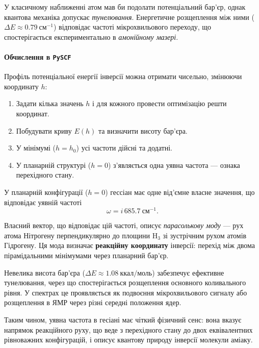 {У класичному наближенні атом  мав би подолати потенціальний бар’єр, однак квантова механіка допускає \emph{тунелювання}.  Енергетичне розщеплення між ними ($\Delta E \approx 0.79~\text{см}^{-1}$) відповідає частоті мікрохвильового переходу, що спостерігається експериментально в \emph{амонійному мазері}.

\paragraph{Обчислення в \texttt{PySCF}}

Профіль потенціальної енергії інверсії можна отримати чисельно, змінюючи координату $h$:

\begin{enumerate}
    \item Задати кілька значень $h$ і для кожного провести оптимізацію решти координат.
    \item Побудувати криву $E(h)$ та визначити висоту бар’єра.
    \item У мінімумі ($h = h_0$) усі частоти дійсні та додатні.
    \item У планарній структурі ($h = 0$) з’являється одна уявна частота — ознака перехідного стану.
\end{enumerate}



У планарній конфігурації ($h = 0$) гессіан має одне від’ємне власне значення, що відповідає уявній частоті
\[
\omega = i\,685.7~\text{см}^{-1}.
\]

Власний вектор, що відповідає цій частоті, описує \emph{парасолькову моду} — рух атома Нітрогену перпендикулярно до площини H$_3$ зі зустрічним рухом атомів Гідрогену. Ця мода визначає \textbf{реакційну координату} інверсії: перехід між двома пірамідальними мінімумами через планарний бар’єр.

Невелика висота бар’єра ($\Delta E \approx 1.08~\text{ккал/моль}$) забезпечує ефективне тунелювання, через що спостерігається розщеплення основного коливального рівня. У спектрах це проявляється як подвоєння мікрохвильового сигналу або розщеплення в ЯМР через різні середні положення ядер.

Таким чином, уявна частота в гесіані має чіткий фізичний сенс: вона вказує напрямок реакційного руху, що веде з перехідного стану до двох еквівалентних рівноважних конфігурацій, і описує квантову природу інверсії молекули аміаку.


}
